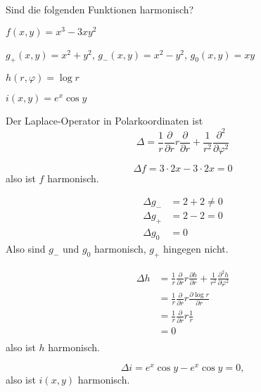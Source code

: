 Sind die folgenden Funktionen harmonisch?
\begin{teilaufgaben}
\item $f(x,y)=x^3-3xy^2$
\item $g_+(x,y)=x^2+y^2$, $g_-(x,y)=x^2-y^2$, $g_0(x,y)=xy$
\item $h(r,\varphi)=\log r$
\item $i(x,y)=e^x\cos y$
\end{teilaufgaben}

\begin{hinweis}
Der Laplace-Operator in Polarkoordinaten ist
\[
\Delta =
\frac1r\frac{\partial}{\partial r}r\frac{\partial}{\partial r}
+
\frac1{r^2}\frac{\partial^2}{\partial\varphi^2}
\]
\end{hinweis}

\begin{loesung}
\begin{teilaufgaben}
\item
\[
\Delta f
=
3\cdot 2x-3\cdot 2x=0
\]
also ist $f$ harmonisch.
\item
\begin{align*}
\Delta g_-
&=
2+2\ne 0
\\
\Delta g_+
&=
2-2=0
\\
\Delta g_0
&=
0
\end{align*}
Also sind $g_-$ und $g_0$ harmonisch, $g_+$ hingegen nicht.
\item
\begin{align*}
\Delta h&=
\frac1r\frac{\partial}{\partial r}r\frac{\partial h}{\partial r}
+
\frac1{r^2}\frac{\partial^2 h}{\partial\varphi^2}
\\
&=
\frac1r\frac{\partial}{\partial r}r\frac{\partial \log r}{\partial r}
\\
&=
\frac1r\frac{\partial}{\partial r}r\frac1r
\\
&=0
\\
\end{align*}
also ist $h$ harmonisch.
\item
\[
\Delta i=e^x\cos y-e^x\cos y=0,
\]
also ist $i(x,y)$ harmonisch.
\qedhere
\end{teilaufgaben}
\end{loesung}
